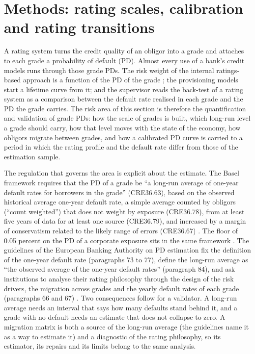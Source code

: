 
\section{Methods: rating scales, calibration and rating transitions}
\label{sec:ratings}

A rating system turns the credit quality of an obligor into a grade and attaches to each grade a probability of default (PD). Almost every use of a bank's credit models runs through those grade PDs. The risk weight of the internal ratings-based approach is a function of the PD of the grade \citep{ratings:bcbs2005,ratings:gordy2003}; the provisioning models start a lifetime curve from it; and the supervisor reads the back-test of a rating system as a comparison between the default rate realised in each grade and the PD the grade carries. The risk area of this section is therefore the quantification and validation of grade PDs: how the scale of grades is built, which long-run level a grade should carry, how that level moves with the state of the economy, how obligors migrate between grades, and how a calibrated PD curve is carried to a period in which the rating profile and the default rate differ from those of the estimation sample.

The regulation that governs the area is explicit about the estimate. The Basel framework requires that the PD of a grade be ``a long-run average of one-year default rates for borrowers in the grade'' (CRE36.63), based on the observed historical average one-year default rate, a simple average counted by obligors (``count weighted'') that does not weight by exposure (CRE36.78), from at least five years of data for at least one source (CRE36.79), and increased by a margin of conservatism related to the likely range of errors (CRE36.67) \citep{ratings:cre36}. The floor of 0.05 percent on the PD of a corporate exposure sits in the same framework \citep{ratings:cre32}. The guidelines of the European Banking Authority on PD estimation fix the definition of the one-year default rate (paragraphs 73 to 77), define the long-run average as ``the observed average of the one-year default rates'' (paragraph 84), and ask institutions to analyse their rating philosophy through the design of the risk drivers, the migration across grades and the yearly default rates of each grade (paragraphs 66 and 67) \citep{ratings:eba2017}. Two consequences follow for a validator. A long-run average needs an interval that says how many defaults stand behind it, and a grade with no default needs an estimate that does not collapse to zero. A migration matrix is both a source of the long-run average (the guidelines name it as a way to estimate it) and a diagnostic of the rating philosophy, so its estimator, its repairs and its limits belong to the same analysis.

